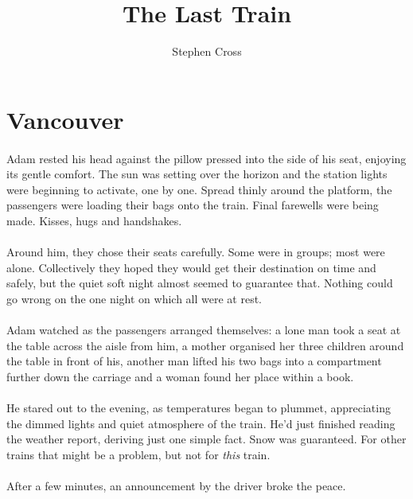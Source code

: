 \documentclass{article}
\title{The Last Train}
\author{Stephen Cross}
\date{}
\begin{document}
\maketitle

\section{Vancouver}

\paragraph{}
Adam rested his head against the pillow pressed into the side of his seat, enjoying its gentle comfort. The sun was setting over the horizon and the station lights were beginning to activate, one by one. Spread thinly around the platform, the passengers were loading their bags onto the train. Final farewells were being made. Kisses, hugs and handshakes.

\paragraph{}
Around him, they chose their seats carefully. Some were in groups; most were alone. Collectively they hoped they would get their destination on time and safely, but the quiet soft night almost seemed to guarantee that. Nothing could go wrong on the one night on which all were at rest.

\paragraph{}
Adam watched as the passengers arranged themselves: a lone man took a seat at the table across the aisle from him, a mother organised her three children around the table in front of his, another man lifted his two bags into a compartment further down the carriage and a woman found her place within a book.

\paragraph{}
He stared out to the evening, as temperatures began to plummet, appreciating the dimmed lights and quiet atmosphere of the train. He'd just finished reading the weather report, deriving just one simple fact. Snow was guaranteed. For other trains that might be a problem, but not for \emph{this} train.

\paragraph{}
After a few minutes, an announcement by the driver broke the peace.
\end{document}
